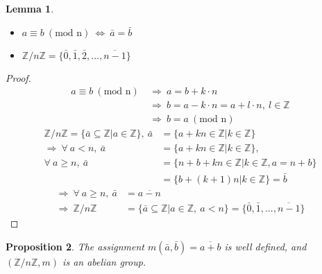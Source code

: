 \documentclass{article}
\newtheorem{theorem}{Proposition}[section]
\newtheorem{lemma}[theorem]{Lemma}
\theoremstyle{definition}
\theoremstyle{remark}
\begin{document}
\begin{lemma}
\begin{itemize}
\item $a\equiv b ~(\text{mod n}) ~\Leftrightarrow ~\bar{a}=\bar{b}$
\item $\mathbb{Z}/n\mathbb{Z} = \lbrace\bar{0}, \bar{1}, \bar{2}, ..., \overline{n-1}\rbrace $
\end{itemize}
\end{lemma}
\begin{proof}
\begin{align*}
a\equiv b~(\text{mod n})~&\Rightarrow ~ a= b + k\cdot n\\
&\Rightarrow ~ b = a - k\cdot n = a + l\cdot n ,~ l\in \mathbb{Z}\\
&\Rightarrow ~ b=a~(\text{mod n})
\end{align*}
\begin{align*}
\mathbb{Z}/n\mathbb{Z}=\lbrace \bar{a}\subseteq \mathbb{Z}|a\in \mathbb{Z}\rbrace,~ \bar{a}&=\lbrace a + kn \in \mathbb{Z}| k\in \mathbb{Z}\rbrace\\
\Rightarrow ~\forall~a<n, ~ \bar{a} &=\lbrace a + kn \in \mathbb{Z}| k\in \mathbb{Z}\rbrace,\\ \forall ~ a\geq n,~\bar{a}&=\lbrace n+b +kn\in \mathbb{Z}|k\in\mathbb{Z}, a=n+b\rbrace\\
&=\lbrace b+(k+1)n|k\in\mathbb{Z}\rbrace=\bar{b}
\end{align*}
\begin{align*}
\Rightarrow ~ \forall ~ a\geq n, ~ \bar{a}&=\overline{a-n}\\
\Rightarrow  ~ \mathbb{Z}/n\mathbb{Z}&=\lbrace \bar{a}\subseteq \mathbb{Z}|a\in \mathbb{Z}, ~ a<n\rbrace=\lbrace \bar{0}, \bar{1}, ..., \overline{n-1}\rbrace
\end{align*}
\end{proof}
\begin{theorem}
The assignment $m(\bar{a},\bar{b})=\overline{a+b}$ is well defined, and $(\mathbb{Z}/n\mathbb{Z},m) $ is an abelian group.\\
\end{theorem}
\end{document}
